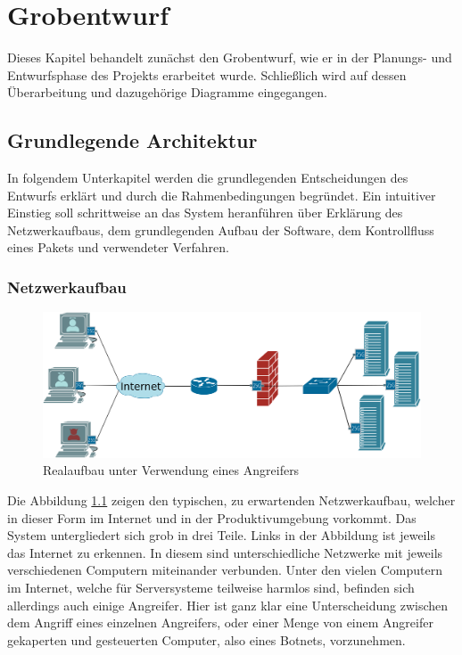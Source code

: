 \documentclass[../review_3.tex]{subfiles}
\begin{document}
\chapter{Grobentwurf}\thispagestyle{fancy}
Dieses Kapitel behandelt zunächst den Grobentwurf, wie er in der Planungs- und Entwurfsphase des Projekts erarbeitet wurde. Schließlich wird auf dessen Überarbeitung und dazugehörige Diagramme eingegangen.

\section{Grundlegende Architektur}
In folgendem Unterkapitel werden die grundlegenden Entscheidungen des Entwurfs erklärt und durch die Rahmenbedingungen begründet. Ein intuitiver Einstieg soll schrittweise an das System heranführen über Erklärung des Netzwerkaufbaus, dem grundlegenden Aufbau der Software, dem Kontrollfluss eines Pakets und verwendeter Verfahren.

\subsection{Netzwerkaufbau}
\begin{figure}[h]
    \centering
    \includegraphics[width=1.0\linewidth]{img/Netzwerkplan-Real.png}
    \caption{Realaufbau unter Verwendung eines Angreifers}
    \label{fig:netzwerkplan-real}
\end{figure}
Die Abbildung \ref{fig:netzwerkplan-real} zeigen den typischen, zu erwartenden Netzwerkaufbau, welcher in dieser Form im Internet und in der Produktivumgebung vorkommt. Das System untergliedert sich grob in drei Teile. Links in der Abbildung ist jeweils das Internet zu erkennen. In diesem sind unterschiedliche Netzwerke mit jeweils verschiedenen Computern miteinander verbunden. Unter den vielen Computern im Internet, welche für Serversysteme teilweise harmlos sind, befinden sich allerdings auch einige Angreifer. Hier ist ganz klar eine Unterscheidung zwischen dem Angriff eines einzelnen Angreifers, oder einer Menge von einem Angreifer gekaperten und gesteuerten Computer, also eines Botnets, vorzunehmen.
\end{document}
